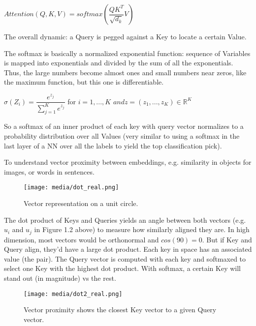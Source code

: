\begin{center}
	$ Attention(Q, K, V) = softmax(\dfrac{QK^T}{\sqrt{d_k}} V ) $
	\end{center}

The overall dynamic: a Query is pegged against a Key to locate a certain Value.	

The softmax is basically a normalized exponential function: sequence of Variables is 
mapped into exponentials and divided by the sum of all the exponentials. Thus, the 
large numbers become almost ones and small numbers near zeros, like the maximum 
function, but this one is differentiable. 

\begin{center}
	$ \displaystyle\sigma(Z_i) = \dfrac{e^{z_j}}{\sum_{j=1}^K e^{z_j}}$ for $i=1,...,K$ $and z=(z_1,...,z_K) \in \mathbb{R}^K $
	\end{center}

So a softmax of an inner product of each key with query vector normalizes to a 
probability distribution over all Values (very similar to using a softmax in the last 
layer of a NN over all the labels to yield the top classification pick). 


To understand vector proximity between embeddings, e.g. similarity in objects for images, or words in sentences.

\begin{figure}[H]
	\begin{center}
	\texttt{[image: media/dot\_real.png]}
	\end{center}
	\caption[Vector Representation]{Vector representation on a unit circle.}
	\end{figure}

The dot product of Keys and Queries yields an angle between both vectors (e.g. $u_i$ and $u_j$ in Figure 1.2 above) to measure 
how similarly aligned they are. In high dimension, most vectors would be orthonormal 
and $cos(90)=0$. But if Key and Query align, they'd have a large dot product. 
Each key in space has an associated value (the pair). The Query vector is computed with 
each key and softmaxed to select one Key with the highest dot product. With softmax, 
a certain Key will stand out (in magnitude) vs the rest.

\begin{figure}[H]
	\begin{center}
	\texttt{[image: media/dot2\_real.png]}
	\end{center}
	\caption[Key/Query Vector Proximity]{Vector proximity shows the closest Key vector to a given Query vector.}
	\end{figure}

